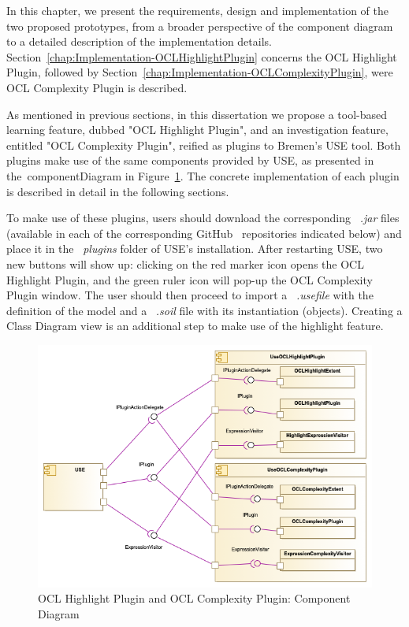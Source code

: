 {In this chapter, we present the requirements, design and implementation of the two proposed prototypes, from a broader perspective of the component diagram to a detailed description of the implementation details. Section~\ref{chap:Implementation-OCLHighlightPlugin} concerns the OCL Highlight Plugin, followed by Section~\ref{chap:Implementation-OCLComplexityPlugin}, were OCL Complexity Plugin is described.}

As mentioned in previous sections, in this dissertation we propose a tool-based learning feature, dubbed "OCL Highlight Plugin", and an investigation feature, entitled "OCL Complexity Plugin", reified as plugins to Bremen's USE tool. 
Both plugins make use of the same components provided by USE, as presented in the~\gls{componentDiagram} in Figure~\ref{fig:05_componentdiagram}. The concrete implementation of each plugin is described in detail in the following sections.

To make use of these plugins, users should download the corresponding ~\textit{.jar} files (available in each of the corresponding GitHub~\cite{github} repositories indicated below) and place it in the ~\textit{plugins} folder of USE's installation. After restarting USE, two new buttons will show up: clicking on the red marker icon opens the OCL Highlight Plugin, and the green ruler icon will pop-up the OCL Complexity Plugin window. The user should then proceed to import a ~\textit{.usefile} with the definition of the model and a ~\textit{.soil} file with its instantiation (objects). Creating a Class Diagram view is an additional step to make use of the highlight feature.

\begin{figure}[ht]
    \centering
    \includegraphics[width=1\textwidth]{Chapters/figures/5_Implementation/ComponentDiagram}
    \caption{OCL Highlight Plugin and OCL Complexity Plugin: Component Diagram}
    \label{fig:05_componentdiagram}
\end{figure}

